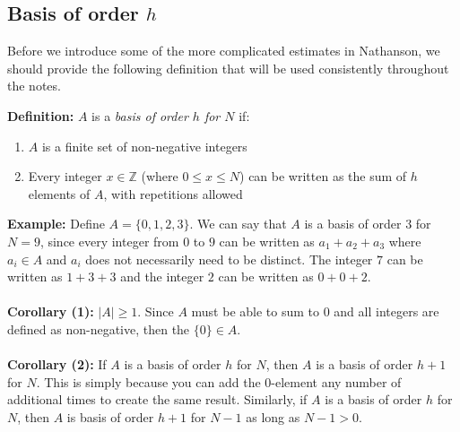 \subsection{Basis of order $h$}
Before we introduce some of the more complicated estimates in Nathanson, we should provide the following definition that will be used consistently throughout the notes. 
\begin{boxedsection}
\textbf{Definition:} $A$ is a \textit{basis of order $h$ for $N$} if:
\begin{enumerate}
    \item $A$ is a finite set of non-negative integers
    \item Every integer $x \in \mathbb{Z}$ (where $0 \leq x \leq N$) can be written as the sum of $h$ elements of $A$, with repetitions allowed
\end{enumerate}
\textbf{Example:} Define $A = \{0,1,2,3\}$. We can say that $A$ is a basis of order $3$ for $N = 9$, since every integer from $0$ to $9$ can be written as $a_1 + a_2 + a_3$ where $a_i \in A$ and $a_i$ does not necessarily need to be distinct. The integer $7$ can be written as $1 + 3 + 3$ and the integer $2$ can be written as $0 + 0 + 2$. \\
\\
\textbf{Corollary (1):} $|A| \geq 1$. Since $A$ must be able to sum to $0$ and all integers are defined as non-negative, then the $\{0\} \in A$.\\
\\
\textbf{Corollary (2):} If $A$ is a basis of order $h$ for $N$, then $A$ is a basis of order $h + 1$ for $N$. This is simply because you can add the $0$-element any number of additional times to create the same result. Similarly, if $A$ is a basis of order $h$ for $N$, then $A$ is basis of order $h + 1$ for $N - 1$ as long as $N - 1 > 0$.
\end{boxedsection}
